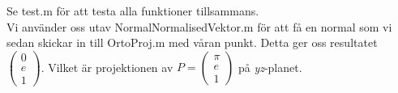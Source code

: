 \ifdefined\ALL
    Se test.m för att testa alla funktioner tillsammans.\\
\fi
Vi använder oss utav NormalNormalisedVektor.m för att få en normal som vi sedan skickar in till OrtoProj.m med våran punkt.
Detta ger oss resultatet $\begin{pmatrix}0\\e\\1\end{pmatrix}$. 
Vilket är projektionen av $P = \begin{pmatrix}\pi\\e\\1\end{pmatrix}$ på \emph{yz}-planet.